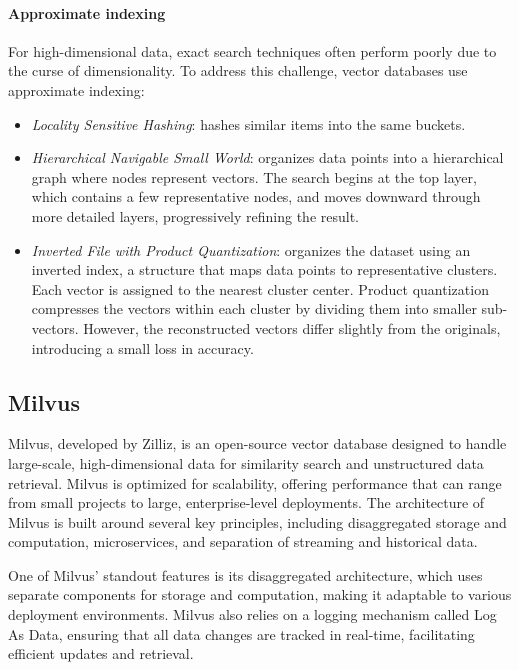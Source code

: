 \paragraph*{Approximate indexing}
For high-dimensional data, exact search techniques often perform poorly due to the curse of dimensionality.
To address this challenge, vector databases use approximate indexing:
\begin{itemize}
    \item \textit{Locality Sensitive Hashing}: hashes similar items into the same buckets. 
    \item \textit{Hierarchical Navigable Small World}: organizes data points into a hierarchical graph where nodes represent vectors. 
        The search begins at the top layer, which contains a few representative nodes, and moves downward through more detailed layers, progressively refining the result. 
    \item \textit{Inverted File with Product Quantization}: organizes the dataset using an inverted index, a structure that maps data points to representative clusters. 
        Each vector is assigned to the nearest cluster center. 
        Product quantization compresses the vectors within each cluster by dividing them into smaller sub-vectors. 
        However, the reconstructed vectors differ slightly from the originals, introducing a small loss in accuracy.
\end{itemize}

\subsection{Milvus}
Milvus, developed by Zilliz, is an open-source vector database designed to handle large-scale, high-dimensional data for similarity search and unstructured data retrieval. 
Milvus is optimized for scalability, offering performance that can range from small projects to large, enterprise-level deployments. 
The architecture of Milvus is built around several key principles, including disaggregated storage and computation, microservices, and separation of streaming and historical data. 

One of Milvus' standout features is its disaggregated architecture, which uses separate components for storage and computation, making it adaptable to various deployment environments. 
Milvus also relies on a logging mechanism called Log As Data, ensuring that all data changes are tracked in real-time, facilitating efficient updates and retrieval.

